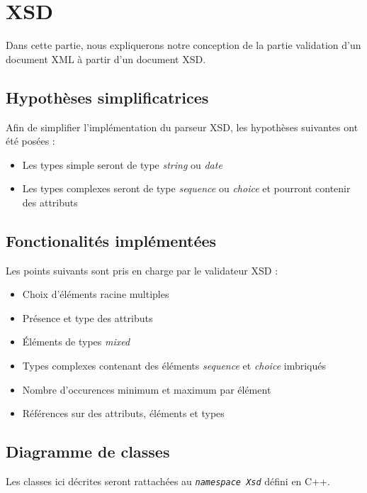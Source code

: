 \chapter{XSD}

Dans cette partie, nous expliquerons notre conception de la partie validation d'un document XML à partir d'un document XSD.

\section{Hypothèses simplificatrices}
	Afin de simplifier l'implémentation du parseur XSD, les hypothèses suivantes ont été posées :
	\begin{itemize}
		\item{Les types simple seront de type \textit{string} ou \textit{date}}
		\item{Les types complexes seront de type \textit{sequence} ou \textit{choice} et pourront contenir des attributs}
	\end{itemize}
	
\section{Fonctionalités implémentées}
Les points suivants sont pris en charge par le validateur XSD :
\begin{itemize}
    \item{Choix d'éléments racine multiples}
    \item{Présence et type des attributs}
    \item{Éléments de types \textit{mixed}}
    \item{Types complexes contenant des éléments \textit{sequence} et \textit{choice} imbriqués}
    \item{Nombre d'occurences minimum et maximum par élément}
    \item{Références sur des attributs, éléments et types}
\end{itemize}

\section{Diagramme de classes}
Les classes ici décrites seront rattachées au \textit{\lstinline$namespace Xsd$} défini en C++.

